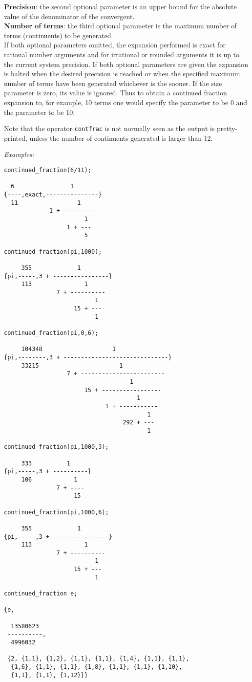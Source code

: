 \textbf{Precision}: the second optional parameter  is an upper
bound for the absolute value of the  denominator of the convergent.\\
\textbf{Number of terms}: the third optional parameter  is
the maximum number of terms (continuents) to be generated.\\
If both optional parameters omitted, the expansion performed is exact for
rational number arguments and for irrational or rounded arguments it is up
to the current system precision.
If both optional parameters are given the expansion is halted when the desired
precision is reached or when the specified maximum number of terms have
been generated whichever is the sooner. If the size parameter is zero,
its value is ignored.  Thus to obtain a continued fraction expansion to,
for example, 10 terms one would specify the  parameter to be 0 and
the  parameter to be 10.

Note that the operator \texttt{contfrac} is not normally seen as the output
is pretty-printed, unless the number of continuents generated is larger
than 12.

\textit{Examples:}
\begin{verbatim}
continued_fraction(6/11);

  6                1
{----,exact,---------------}
  11                 1
             1 + ---------
                       1
                  1 + ---
                       5

continued_fraction(pi,1000);

     355             1
{pi,-----,3 + ----------------}
     113               1
               7 + ----------
                          1
                    15 + ---
                          1

continued_fraction(pi,0,6);

     104348                    1
{pi,--------,3 + ------------------------------}
     33215                       1
                  7 + ------------------------
                                    1
                       15 + -----------------
                                      1
                             1 + -----------
                                         1
                                  292 + ---
                                         1

continued_fraction(pi,1000,3);

     333          1
{pi,-----,3 + ----------}
     106            1
               7 + ----
                    15

continued_fraction(pi,1000,6);

     355             1
{pi,-----,3 + ----------------}
     113               1
               7 + ----------
                          1
                    15 + ---
                          1

continued_fraction e;

{e,

  13580623
 ----------,
  4996032

 {2, {1,1}, {1,2}, {1,1}, {1,1}, {1,4}, {1,1}, {1,1},
  {1,6}, {1,1}, {1,1}, {1,8}, {1,1}, {1,1}, {1,10},
  {1,1}, {1,1}, {1,12}}}
\end{verbatim}


